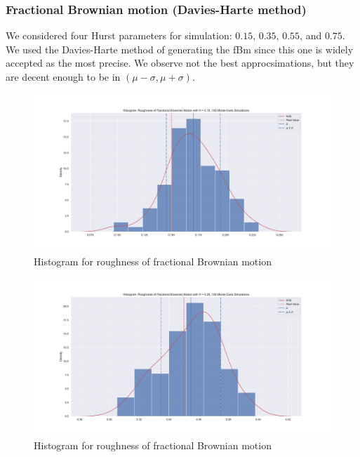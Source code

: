         \subsubsection{Fractional Brownian motion (Davies-Harte method)}
            We considered four Hurst parameters for simulation: $0.15$, $0.35$, $0.55$, and $0.75$. We used the Davies-Harte method of generating 
            the fBm since this one is widely accepted as the most precise. We observe not the best approcsimations, but they are decent enough to be in $(\mu-\sigma, \mu+\sigma)$.
            \begin{figure}[htbp]
                \centering
                \includegraphics[width=\linewidth]{fig/Histogram. Roughness of Fractional Brownian Motion with H = 0.15, 100 Monte-Carlo Simulations.pdf}
                \caption{Histogram for roughness of fractional Brownian motion}
            \end{figure}
            \begin{figure}[htbp]
                \centering
                \includegraphics[width=\linewidth]{fig/Histogram. Roughness of Fractional Brownian Motion with H = 0.35, 100 Monte-Carlo Simulations.pdf}
                \caption{Histogram for roughness of fractional Brownian motion}
            \end{figure}
